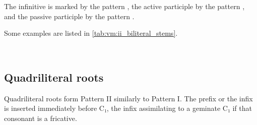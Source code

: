 \documentclass[grammar]{subfiles}
\begin{document}
The infinitive is marked by the pattern , the active participle by the
pattern , and the passive participle by the pattern .  

Some examples are listed in \cref{tab:vm:ii_biliteral_stems}. 

\begin{table}[h!]\small\capstart
  \centering
  \\
  \caption{Pattern II biliteral stems \label{tab:vm:ii_biliteral_stems}}
\end{table}


\subsection{Quadriliteral roots}
\label{ssec:vm:ii_quadriliteral_roots}

Quadriliteral roots form Pattern II similarly to Pattern I. The prefix
 or the infix  is inserted immediately before C₁, the infix
assimilating to a geminate C₁ if that consonant is a fricative. 
\end{document}
